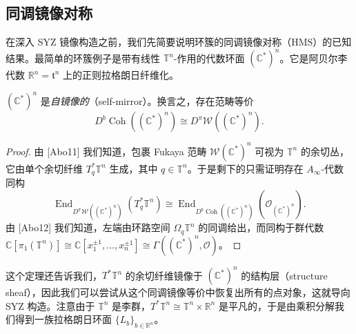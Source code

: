 
\subsection{同调镜像对称}

在深入 SYZ 镜像构造之前，我们先简要说明环簇的同调镜像对称（HMS）的已知结果。最简单的环簇例子是带有线性 $\mathbb{T}^n$-作用的代数环面 $(\mathbb{C}^{\ast})^n$。它是阿贝尔李代数 $\mathbb{R}^n=\mathfrak{t}^n$ 上的正则拉格朗日纤维化。

\begin{theorem*}
$\left(\mathbb{C}^{\ast}\right)^n$ 是\emph{自镜像的}（self-mirror）。换言之，存在范畴等价
\[
  D^b\operatorname{Coh} \left(\left(\mathbb{C}^{\ast}\right)^n\right)\cong D^{\pi}\mathcal{W} \left(\left(\mathbb{C}^{\ast}\right)^n\right).
\]
\end{theorem*}

\begin{proof}
由 [Abo11] 我们知道，包裹 Fukaya 范畴 $\mathcal{W}\left(\mathbb{C}^{\ast}\right)^n$ 可视为 $\mathbb{T}^n$ 的余切丛，它由单个余切纤维 $T^{\ast}_q\mathbb{T}^n$ 生成，其中 $q\in\mathbb{T}^n$。于是剩下的只需证明存在 $A_{\infty}$-代数同构
\[
  \operatorname{End}_{D^{\pi}\mathcal{W} \left(\left(\mathbb{C}^{\ast}\right)^n\right)} \left(T^{\ast}_q\mathbb{T}^n\right)\cong \operatorname{End}_{D^b\operatorname{Coh} \left(\left(\mathbb{C}^{\ast}\right)^n\right)} \left(\mathcal{O}_{\left(\mathbb{C}^{\ast}\right)^n}\right).
\]
由 [Abo12] 我们知道，左端由环路空间 $\Omega_q\mathbb{T}^n$ 的同调给出，而同构于群代数 $\mathbb{C}[\pi_1 (\mathbb{T}^n)]\cong\mathbb{C}[x_1^{\pm 1},\dotsc, x_n^{\pm 1}]\cong\Gamma\left(\left(\mathbb{C}^{\ast}\right)^n,\mathcal{O}\right)$。
\end{proof}


这个定理还告诉我们，$T^{\ast}\mathbb{T}^n$ 的余切纤维镜像于 $\left(\mathbb{C}^{\ast}\right)^n$ 的结构层（structure sheaf），因此我们可以尝试从这个同调镜像等价中恢复出所有的点对象，这就导向 SYZ 构造。注意由于 $\mathbb{T}^n$ 是李群，$T^{\ast}\mathbb{T}^n\cong\mathbb{T}^n\times\mathbb{R}^n$ 是平凡的，于是由乘积分解我们得到一族拉格朗日环面 $\{L_b\}_{b\in \mathbb{R}^n}$。

